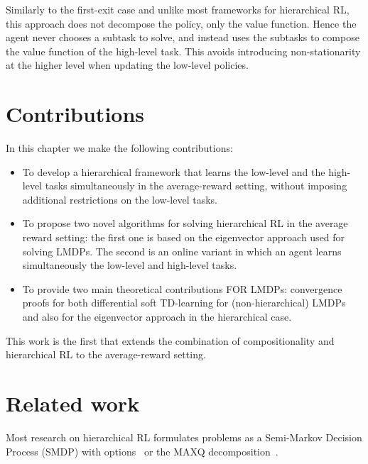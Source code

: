 Similarly to the first-exit case and unlike most frameworks for hierarchical RL, this approach does not decompose the policy, only the value function. Hence the agent never chooses a subtask to solve, and instead uses the subtasks to compose the value function of the high-level task. 
This avoids introducing non-stationarity at the higher level when updating the low-level policies.

\section{Contributions}
In this chapter we make the following contributions:
\begin{itemize}
  \item To develop a hierarchical framework that learns the low-level and  the high-level tasks simultaneously in the average-reward setting, without imposing additional restrictions on the low-level tasks.
    \item To propose two novel algorithms for solving hierarchical RL in the average reward setting: the first one is based on the eigenvector approach used for solving LMDPs. The second is an online variant in which an agent learns simultaneously the low-level and high-level tasks.
    \item To provide two main theoretical contributions FOR LMDPs: convergence proofs for both differential soft TD-learning for (non-hierarchical) LMDPs and also for the eigenvector approach in the hierarchical case.
\end{itemize}

This work is the first that extends the combination of compositionality and hierarchical RL to the average-reward setting.

\section{Related work}
Most research on hierarchical RL formulates problems as a Semi-Markov Decision Process (SMDP) with options~\citep{Sutton1999} or the MAXQ decomposition~\citep{Dietterich2000}.

